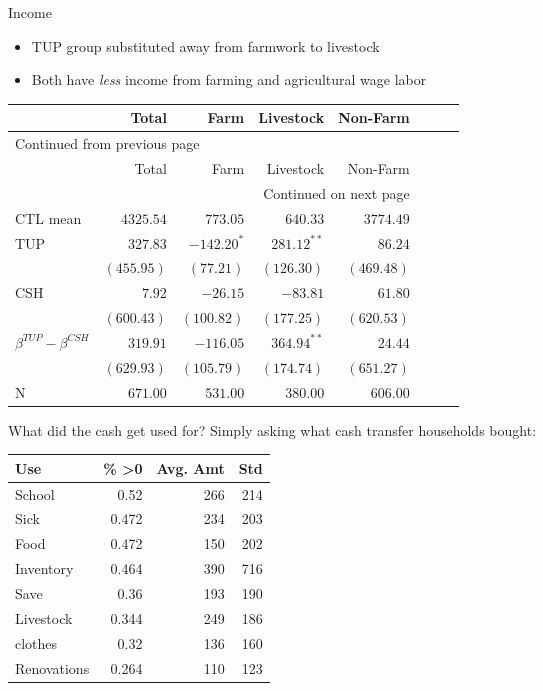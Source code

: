 \documentclass[t,presentation]{beamer}
\begin{document}
\begin{frame}[label={sec:orgheadline19}]{Income}
\begin{itemize}
\item TUP group substituted away from farmwork to livestock
\item Both have \emph{less} income from farming and agricultural wage labor
\end{itemize}

\begin{longtable}{lrrrrrrr}
\label{tab:orgtable1}

\\
\hline
 & Total & Farm & Livestock & Non-Farm\\
\hline
\endfirsthead
\multicolumn{5}{l}{Continued from previous page} \\
\hline

 & Total & Farm & Livestock & Non-Farm \\

\hline
\endhead
\hline\multicolumn{5}{r}{Continued on next page} \\
\endfoot
\endlastfoot
\hline
CTL mean & \(4325.54\) & \(773.05\) & \(640.33\) & \(3774.49\)\\
\hline
TUP & \(327.83\) & \(-142.20^{*}\) & \(281.12^{**}\) & \(86.24\)\\
 & \((455.95)\) & \((77.21)\) & \((126.30)\) & \((469.48)\)\\
CSH & \(7.92\) & \(-26.15\) & \(-83.81\) & \(61.80\)\\
 & \((600.43)\) & \((100.82)\) & \((177.25)\) & \((620.53)\)\\
\hline
\(\beta^{TUP}-\beta^{CSH}\) & \(319.91\) & \(-116.05\) & \(364.94^{**}\) & \(24.44\)\\
 & \((629.93)\) & \((105.79)\) & \((174.74)\) & \((651.27)\)\\
\hline
N & \(671.00\) & \(531.00\) & \(380.00\) & \(606.00\)\\
\hline
\end{longtable}
\end{frame}

\begin{frame}[label={sec:orgheadline20}]{What did the cash get used for?}
Simply asking what cash transfer households bought:

\begin{center}
\begin{tabular}{lrrr}
\hline
Use & \% >0 & Avg. Amt & Std\\
\hline
School & 0.52 & 266 & 214\\
Sick & 0.472 & 234 & 203\\
Food & 0.472 & 150 & 202\\
Inventory & 0.464 & 390 & 716\\
Save & 0.36 & 193 & 190\\
Livestock & 0.344 & 249 & 186\\
clothes & 0.32 & 136 & 160\\
Renovations & 0.264 & 110 & 123\\
\hline
\end{tabular}
\end{center}
\end{frame}
\end{document}
